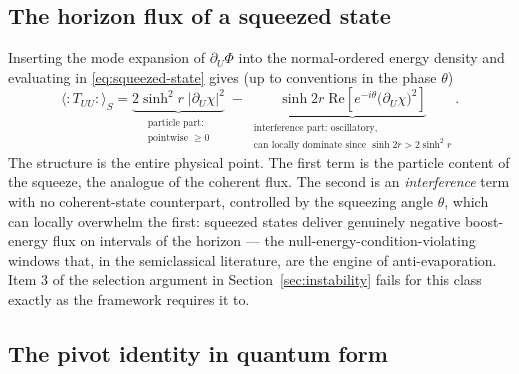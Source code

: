 \documentclass[11pt]{article}
\begin{document}
\subsection{The horizon flux of a squeezed state}
\label{app:flux}

Inserting the mode expansion of $\partial_U \Phi$ into the normal-ordered energy density and evaluating in \eqref{eq:squeezed-state} gives (up to conventions in the phase $\theta$)
\begin{equation}
\big\langle{:}T_{UU}{:}\big\rangle_{S}
= \underbrace{2\sinh^2\! r\;\big|\partial_U \chi\big|^2}_{\substack{\text{particle part:}\\ \text{pointwise } \ge 0}}
\;-\; \underbrace{\sinh 2r\;\mathrm{Re}\!\left[e^{-i\theta}\big(\partial_U \chi\big)^2\right]}_{\substack{\text{interference part: oscillatory,}\\ \text{can locally dominate since } \sinh 2r > 2\sinh^2\! r}}.
\label{eq:TUU-squeezed}
\end{equation}
The structure is the entire physical point. The first term is the particle content of the squeeze, the analogue of the coherent flux. The second is an \emph{interference} term with no coherent-state counterpart, controlled by the squeezing angle $\theta$, which can locally overwhelm the first: squeezed states deliver genuinely negative boost-energy flux on intervals of the horizon --- the null-energy-condition-violating windows that, in the semiclassical literature, are the engine of anti-evaporation. Item 3 of the selection argument in Section~\ref{sec:instability} fails for this class exactly as the framework requires it to.

\subsection{The pivot identity in quantum form}
\label{app:pivot}
\end{document}
